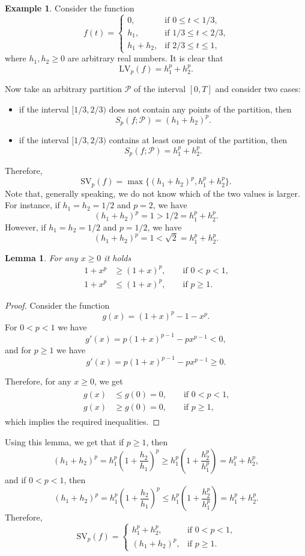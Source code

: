 \documentclass[a4paper,oneside,12pt]{extreport}
\theoremstyle{plain}
\newtheorem{lemma}[theorem]{Lemma}
\theoremstyle{definition}
\newtheorem{example}[theorem]{Example}
\theoremstyle{remark}
\newcommand*{\mcP}{\mathcal{P}}
\newcommand*{\ges}{\geqslant}
\newcommand*{\les}{\leqslant}
\newcommand*{\LV}{\text{LV}}
\newcommand*{\SV}{\text{SV}}
\begin{document}
\begin{example}
Consider the function
\[
f(t)=
\begin{cases}
0,&\text{if $0\les t<1/3$,}\\
h_1,&\text{if $1/3\les t<2/3$,}\\
h_1+h_2,&\text{if $2/3\les t\les 1$,}
\end{cases}
\]
where $h_1,h_2\ges 0$ are arbitrary real numbers. It is clear that
\[
\LV_p(f)=h_1^p+h_2^p.
\]

Now take an arbitrary partition $\mcP$ of the interval $[0,T]$ and consider two cases:
\begin{itemize}
\item
if the interval $[1/3,2/3)$ does not contain any points of the partition, then
\[
S_p(f;\mcP)=(h_1+h_2)^p.
\]

\item
if the interval $[1/3,2/3)$ contains at least one point of the partition, then
\[
S_p(f;\mcP)=h_1^p+h_2^p.
\]
\end{itemize}
Therefore,
\[
\SV_p(f)=\max\{(h_1+h_2)^p,h_1^p+h_2^p\}.
\]
Note that, generally speaking, we do not know which of the two values is larger. For instance, if $h_1=h_2=1/2$ and $p=2$, we have
\[
(h_1+h_2)^p=1>1/2=h_1^p+h_2^p.
\]
However, if $h_1=h_2=1/2$ and $p=1/2$, we have
\[
(h_1+h_2)^p=1<\sqrt{2}=h_1^p+h_2^p.
\]


\begin{lemma}
For any $x\ges 0$ it holds
\begin{equation*}
\begin{aligned}
1+x^p&\ges (1+x)^p,\qquad\text{if $0<p<1$,}\\
1+x^p&\les (1+x)^p,\qquad\text{if $p\ges 1$.}
\end{aligned}
\end{equation*}
\end{lemma}


\begin{proof}
Consider the function
\[
g(x)=(1+x)^p-1-x^p.
\]
For $0<p<1$ we have
\[
g'(x)=p(1+x)^{p-1}-px^{p-1}<0,
\]
and for $p\ges 1$ we have
\[
g'(x)=p(1+x)^{p-1}-px^{p-1}\ges 0.
\]

Therefore, for any $x\ges 0$, we get
\begin{gather*}
\begin{aligned}
g(x)&\les g(0)=0,\qquad\text{if $0<p<1$,}\\
g(x)&\ges g(0)=0,\qquad\text{if $p\ges 1$,}
\end{aligned}
\end{gather*}
which implies the required inequalities.
\end{proof}


Using this lemma, we get that if $p\ges 1$, then
\[
(h_1+h_2)^p=h_1^p\left(1+\frac{h_2}{h_1}\right)^p\ges h_1^p\left(1+\frac{h_2^p}{h_1^p}\right)=h_1^p+h_2^p,
\]
and if $0<p<1$, then
\[
(h_1+h_2)^p=h_1^p\left(1+\frac{h_2}{h_1}\right)^p\les h_1^p\left(1+\frac{h_2^p}{h_1^p}\right)=h_1^p+h_2^p.
\]
Therefore,
\[
\SV_p(f)=
\begin{cases}
h_1^p+h_2^p,&\text{if $0<p<1$,}\\
(h_1+h_2)^p,&\text{if $p\ges 1$.}
\end{cases}
\]
\end{example}
\end{document}
